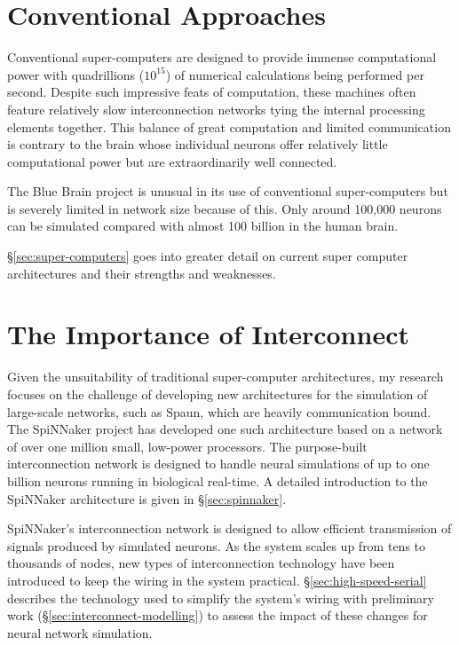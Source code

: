 	\section{Conventional Approaches}
	
		
		Conventional super-computers are designed to provide immense computational
		power with quadrillions ($10^{15}$) of numerical calculations being
		performed per second. Despite such impressive feats of computation, these
		machines often feature relatively slow interconnection networks tying the
		internal processing elements together. This balance of great computation and
		limited communication is contrary to the brain whose individual neurons
		offer relatively little computational power but are extraordinarily well
		connected.
		
		The Blue Brain project is unusual in its use of conventional super-computers
		but is severely limited in network size because of this.  Only around
		100,000 neurons can be simulated compared with almost 100 billion in the
		human brain.
		
		\S\ref{sec:super-computers} goes into greater detail on current super
		computer architectures and their strengths and weaknesses.
	
	\section{The Importance of Interconnect}
		
		Given the unsuitability of traditional super-computer architectures, my
		research focuses on the challenge of developing new architectures for the
		simulation of large-scale networks, such as Spaun, which are heavily
		communication bound.  The SpiNNaker project \cite{furber06} has developed
		one such architecture based on a network of over one million small,
		low-power processors. The purpose-built interconnection network is designed
		to handle neural simulations of up to one billion neurons running in
		biological real-time. A detailed introduction to the SpiNNaker architecture
		is given in \S\ref{sec:spinnaker}.
		
		SpiNNaker's interconnection network is designed to allow efficient
		transmission of signals produced by simulated neurons. As the system scales
		up from tens to thousands of nodes, new types of interconnection technology
		have been introduced to keep the wiring in the system practical.
		\S\ref{sec:high-speed-serial} describes the technology used to simplify the
		system's wiring with preliminary work (\S\ref{sec:interconnect-modelling})
		to assess the impact of these changes for neural network simulation.
		
